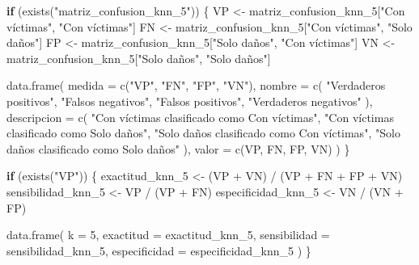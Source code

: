 \documentclass[
  11pt,
  letterpaper,
]{book}
\newenvironment{Shaded}{\begin{snugshade}}{\end{snugshade}}
\newcommand{\AttributeTok}[1]{\textcolor[rgb]{0.40,0.45,0.13}{#1}}
\newcommand{\ControlFlowTok}[1]{\textcolor[rgb]{0.00,0.23,0.31}{\textbf{#1}}}
\newcommand{\DecValTok}[1]{\textcolor[rgb]{0.68,0.00,0.00}{#1}}
\newcommand{\FunctionTok}[1]{\textcolor[rgb]{0.28,0.35,0.67}{#1}}
\newcommand{\NormalTok}[1]{\textcolor[rgb]{0.00,0.23,0.31}{#1}}
\newcommand{\OtherTok}[1]{\textcolor[rgb]{0.00,0.23,0.31}{#1}}
\newcommand{\SpecialCharTok}[1]{\textcolor[rgb]{0.37,0.37,0.37}{#1}}
\newcommand{\StringTok}[1]{\textcolor[rgb]{0.13,0.47,0.30}{#1}}
\begin{document}
\begin{Shaded}
\begin{Highlighting}[]
\ControlFlowTok{if}\NormalTok{ (}\FunctionTok{exists}\NormalTok{(}\StringTok{"matriz\_confusion\_knn\_5"}\NormalTok{)) \{}
\NormalTok{  VP }\OtherTok{\textless{}{-}}\NormalTok{ matriz\_confusion\_knn\_5[}\StringTok{"Con víctimas"}\NormalTok{, }\StringTok{"Con víctimas"}\NormalTok{]}
\NormalTok{  FN }\OtherTok{\textless{}{-}}\NormalTok{ matriz\_confusion\_knn\_5[}\StringTok{"Con víctimas"}\NormalTok{, }\StringTok{"Solo daños"}\NormalTok{]}
\NormalTok{  FP }\OtherTok{\textless{}{-}}\NormalTok{ matriz\_confusion\_knn\_5[}\StringTok{"Solo daños"}\NormalTok{, }\StringTok{"Con víctimas"}\NormalTok{]}
\NormalTok{  VN }\OtherTok{\textless{}{-}}\NormalTok{ matriz\_confusion\_knn\_5[}\StringTok{"Solo daños"}\NormalTok{, }\StringTok{"Solo daños"}\NormalTok{]}

  \FunctionTok{data.frame}\NormalTok{(}
    \AttributeTok{medida =} \FunctionTok{c}\NormalTok{(}\StringTok{"VP"}\NormalTok{, }\StringTok{"FN"}\NormalTok{, }\StringTok{"FP"}\NormalTok{, }\StringTok{"VN"}\NormalTok{),}
    \AttributeTok{nombre =} \FunctionTok{c}\NormalTok{(}
      \StringTok{"Verdaderos positivos"}\NormalTok{,}
      \StringTok{"Falsos negativos"}\NormalTok{,}
      \StringTok{"Falsos positivos"}\NormalTok{,}
      \StringTok{"Verdaderos negativos"}
\NormalTok{    ),}
    \AttributeTok{descripcion =} \FunctionTok{c}\NormalTok{(}
      \StringTok{"Con víctimas clasificado como Con víctimas"}\NormalTok{,}
      \StringTok{"Con víctimas clasificado como Solo daños"}\NormalTok{,}
      \StringTok{"Solo daños clasificado como Con víctimas"}\NormalTok{,}
      \StringTok{"Solo daños clasificado como Solo daños"}
\NormalTok{    ),}
    \AttributeTok{valor =} \FunctionTok{c}\NormalTok{(VP, FN, FP, VN)}
\NormalTok{  )}
\NormalTok{\}}
\end{Highlighting}
\end{Shaded}

\begin{Shaded}
\begin{Highlighting}[]
\ControlFlowTok{if}\NormalTok{ (}\FunctionTok{exists}\NormalTok{(}\StringTok{"VP"}\NormalTok{)) \{}
\NormalTok{  exactitud\_knn\_5 }\OtherTok{\textless{}{-}}\NormalTok{ (VP }\SpecialCharTok{+}\NormalTok{ VN) }\SpecialCharTok{/}\NormalTok{ (VP }\SpecialCharTok{+}\NormalTok{ FN }\SpecialCharTok{+}\NormalTok{ FP }\SpecialCharTok{+}\NormalTok{ VN)}
\NormalTok{  sensibilidad\_knn\_5 }\OtherTok{\textless{}{-}}\NormalTok{ VP }\SpecialCharTok{/}\NormalTok{ (VP }\SpecialCharTok{+}\NormalTok{ FN)}
\NormalTok{  especificidad\_knn\_5 }\OtherTok{\textless{}{-}}\NormalTok{ VN }\SpecialCharTok{/}\NormalTok{ (VN }\SpecialCharTok{+}\NormalTok{ FP)}

  \FunctionTok{data.frame}\NormalTok{(}
    \AttributeTok{k =} \DecValTok{5}\NormalTok{,}
    \AttributeTok{exactitud =}\NormalTok{ exactitud\_knn\_5,}
    \AttributeTok{sensibilidad =}\NormalTok{ sensibilidad\_knn\_5,}
    \AttributeTok{especificidad =}\NormalTok{ especificidad\_knn\_5}
\NormalTok{  )}
\NormalTok{\}}
\end{Highlighting}
\end{Shaded}
\end{document}
